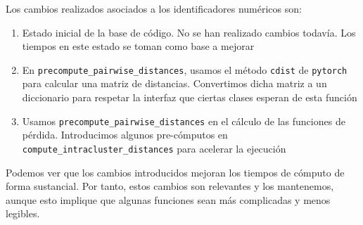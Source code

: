 \begin{table}[H]
    \centering
    \caption{Tabla que recoge el proceso de optimización del código. Identificamos numéricamente los cambios realizados, que a continuación describiremos. Por cada cambio, vemos los nuevos resultados en los \textit{benchmarks}. También vemos el tiempo que tarda en completarse el ciclo de entrenamiento. Los tiempos de los \textit{benchmarks} se dan como un par (media, desviación típica). Damos los tiempos en segundos}
\end{table}

Los cambios realizados asociados a los identificadores numéricos son:

\begin{enumerate}
    \item Estado inicial de la base de código. No se han realizado cambios todavía. Los tiempos en este estado se toman como base a mejorar
    \item En \lstinline|precompute_pairwise_distances|, usamos el método \lstinline|cdist| de \lstinline|pytorch| para calcular una matriz de distancias. Convertimos dicha matriz a un diccionario para respetar la interfaz que ciertas clases esperan de esta función
    \item Usamos \lstinline|precompute_pairwise_distances| en el cálculo de las funciones de pérdida. Introducimos algunos pre-cómputos en \lstinline|compute_intracluster_distances| para acelerar la ejecución
\end{enumerate}

Podemos ver que los cambios introducidos mejoran los tiempos de cómputo de forma sustancial. Por tanto, estos cambios son relevantes y los mantenemos, aunque esto implique que algunas funciones sean más complicadas y menos legibles.

